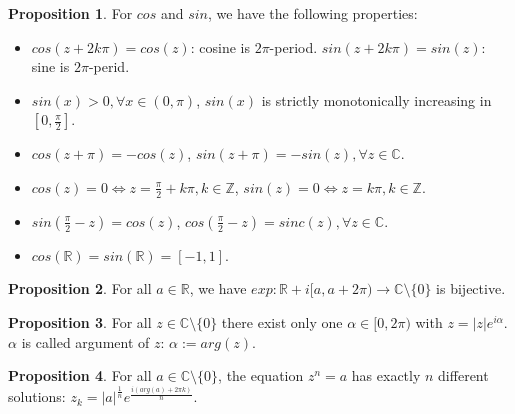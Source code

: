 \documentclass{article}
\theoremstyle{definition}
\newtheorem{prop}{Proposition}[subsection]
\begin{document}
\begin{prop}
For $cos$ and $sin$, we have the following properties:
\begin{itemize}
    \item $cos(z+2k\pi)=cos(z)$: cosine is $2\pi$-period. $sin(z+2k\pi)=sin(z)$: sine is $2\pi$-perid.
    \item $sin(x)>0, \forall x\in(0,\pi)$, $sin(x)$ is strictly monotonically increasing in $[0, \frac{\pi}{2}]$.
    \item $cos(z+\pi)=-cos(z)$, $sin(z+\pi)=-sin(z), \forall z\in\mathbb{C}$.
    \item $cos(z)=0 \Leftrightarrow z=\frac{\pi}{2}+k\pi, k\in\mathbb{Z}$, $sin(z)=0 \Leftrightarrow z=k\pi, k\in\mathbb{Z}$.
    \item $sin(\frac{\pi}{2}-z)=cos(z)$, $cos(\frac{\pi}{2}-z)=sinc(z), \forall z\in\mathbb{C}$.
    \item $cos(\mathbb{R})=sin(\mathbb{R})=[-1,1]$.
\end{itemize}
\end{prop}
\begin{prop}
For all $a\in\mathbb{R}$, we have $exp: \mathbb{R}+i[a,a+2\pi) \to \mathbb{C}\texttt{\textbackslash}\{0\}$ is bijective.
\end{prop}
\begin{prop}
For all $z\in\mathbb{C}\texttt{\textbackslash}\{0\}$ there exist only one $\alpha\in[0,2\pi)$ with $z=|z|e^{i\alpha}$. $\alpha$ is called argument of $z$: $\alpha:=arg(z)$.
\end{prop}
\begin{prop}
For all $a\in\mathbb{C}\texttt{\textbackslash}\{0\}$, the equation $z^n=a$ has exactly $n$ different solutions: $z_k=|a|^{\frac{1}{n}}e^{\frac{i(arg(a)+2\pi k)}{n}}$.
\end{prop}
\end{document}
